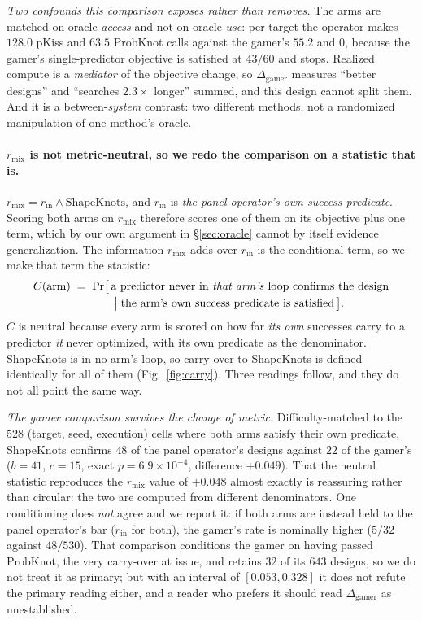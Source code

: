 \documentclass[11pt]{article}
\begin{document}
\emph{Two confounds this comparison exposes rather than removes.} The arms are matched on oracle
\emph{access} and not on oracle \emph{use}: per target the operator makes $128.0$ pKiss and $63.5$ ProbKnot
calls against the gamer's $55.2$ and $0$, because the gamer's single-predictor objective is satisfied at
$43/60$ and stops. Realized compute is a \emph{mediator} of the objective change, so
$\Delta_{\mathrm{gamer}}$ measures ``better designs'' and ``searches $2.3\times$ longer'' summed, and this
design cannot split them. And it is a between-\emph{system} contrast: two different methods, not a randomized
manipulation of one method's oracle.

\paragraph{$r_{\mathrm{mix}}$ is not metric-neutral, so we redo the comparison on a statistic that is.}
$r_{\mathrm{mix}}=r_{\mathrm{in}}\wedge\text{ShapeKnots}$, and $r_{\mathrm{in}}$ is \emph{the panel operator's
own success predicate}. Scoring both arms on $r_{\mathrm{mix}}$ therefore scores one of them on its objective
plus one term, which by our own argument in \S\ref{sec:oracle} cannot by itself evidence generalization. The
information $r_{\mathrm{mix}}$ adds over $r_{\mathrm{in}}$ is the conditional term, so we make that term the
statistic:
\begin{equation}\label{eq:carry}
\begin{aligned}
  C(\text{arm}) \;=\; \Pr\bigl[\,&\text{a predictor never in \emph{that arm's} loop confirms the design}\\[-1pt]
  &\;\big|\; \text{the arm's own success predicate is satisfied}\,\bigr].
\end{aligned}
\end{equation}
$C$ is neutral because every arm is scored on how far \emph{its own} successes carry to a predictor \emph{it}
never optimized, with its own predicate as the denominator. ShapeKnots is in no arm's loop, so carry-over to
ShapeKnots is defined identically for all of them (Fig.~\ref{fig:carry}). Three readings follow, and they do
not all point the same way.

\emph{The gamer comparison survives the change of metric.} Difficulty-matched to the $528$ (target, seed,
execution) cells where both arms satisfy their own predicate, ShapeKnots confirms $48$ of the panel operator's
designs against $22$ of the gamer's ($b{=}41$, $c{=}15$, exact $p{=}6.9\!\times\!10^{-4}$, difference
${+}0.049$). That the neutral statistic reproduces the $r_{\mathrm{mix}}$ value of ${+}0.048$ almost exactly is
reassuring rather than circular: the two are computed from different denominators. One conditioning does
\emph{not} agree and we report it: if both arms are instead held to the panel operator's bar
($r_{\mathrm{in}}$ for both), the gamer's rate is nominally higher ($5/32$ against $48/530$). That comparison
conditions the gamer on having passed ProbKnot, the very carry-over at issue, and retains $32$ of its $643$
designs, so we do not treat it as primary; but with an interval of $[0.053,0.328]$ it does not refute the
primary reading either, and a reader who prefers it should read $\Delta_{\mathrm{gamer}}$ as unestablished.
\end{document}
